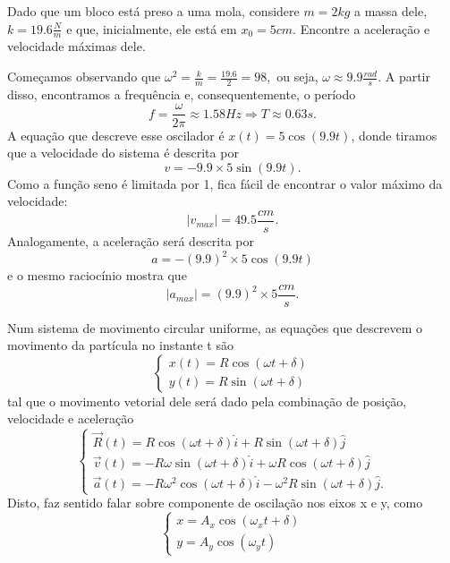 \documentclass[PhysicsII/physicsII_notes.tex]{subfiles}
\begin{document}
\begin{example}
	Dado que um bloco está preso a uma mola, considere \(m=2kg\) a massa dele, \(k = 19.6\frac{N}{m}\) e que, inicialmente,
	ele está em \(x_{0} = 5cm\). Encontre a aceleração e velocidade máximas dele.

	Começamos observando que \(\omega^{2} = \frac{k}{m} = \frac{19.6}{2} = 98,\) ou seja, \(\omega \approx 9.9 \frac{rad}{s}\).
	A partir disso, encontramos a frequência e, consequentemente, o período
	\[
		f = \frac{\omega }{2\pi }\approx 1.58Hz \Rightarrow T\approx 0.63s.
	\]
	A equação que descreve esse oscilador é \(x(t) = 5\cos{(9.9t)}\), donde tiramos que a velocidade do sistema é descrita por
	\[
		v = -9.9\times 5\sin{(9.9t)}.
	\]
	Como a função seno é limitada por 1, fica fácil de encontrar o valor máximo da velocidade:
	\[
		|v_{max}| = 49.5 \frac{cm}{s}.
	\]
	Analogamente, a aceleração será descrita por
	\[
		a = -(9.9)^{2}\times 5\cos{(9.9t)}
	\]
	e o mesmo raciocínio mostra que
	\[
		|a_{max}| = (9.9)^{2}\times 5 \frac{cm}{s}.
	\]
\end{example}
\begin{example}
	Num sistema de movimento circular uniforme, as equações que descrevem o movimento da partícula no instante t são
	\[
		\left\{\begin{array}{ll}
			x(t) = R\cos{(\omega t + \delta )} \\
			y(t) = R\sin{(\omega t + \delta )}
		\end{array}\right.
	\]
	tal que o movimento vetorial dele será dado pela combinação de posição, velocidade e aceleração
	\[
		\left\{\begin{array}{ll}
			\vec{R}(t) = R\cos{(\omega t + \delta )}\hat{i} + R\sin{(\omega t + \delta )}\hat{j}                \\
			\vec{v}(t) = -R\omega \sin{(\omega t + \delta )}\hat{i} + \omega R\cos{(\omega t + \delta )}\hat{j} \\
			\vec{a}(t) = -R\omega ^{2}\cos{(\omega t + \delta )}\hat{i} - \omega ^{2}R\sin{(\omega t + \delta )}\hat{j}.
		\end{array}\right.
	\]
	Disto, faz sentido falar sobre componente de oscilação nos eixos x e y, como
	\[
		\left\{\begin{array}{ll}
			x = A_{x}\cos{(\omega_{x}t + \delta )} \\
			y = A_{y}\cos{(\omega_{y}t)}
		\end{array}\right.
	\]
\end{example}
\end{document}

